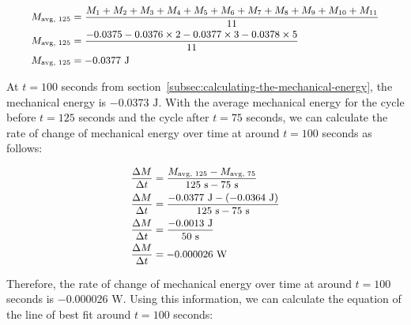 \documentclass[titlepage]{article}
\begin{document}
            \begin{equation}
                \small
                \begin{aligned}
                    M_{\text{avg, 125}} &= \frac{M_1 + M_2 + M_3 + M_4 + M_5 + M_6 + M_7 + M_8 + M_9 + M_{10} + M_{11}}{11} \\
                    M_{\text{avg, 125}} &= \frac{-0.0375 -0.0376 \times 2 -0.0377 \times 3 -0.0378 \times 5 }{11} \\
                    M_{\text{avg, 125}} &= -0.0377 \text{ J} \\
                \end{aligned}\label{eq:average-mechanical-energy-cycle-at-125-seconds}
            \end{equation}
            
            At $t=100$ seconds from section~\ref{subsec:calculating-the-mechanical-energy}, the mechanical energy is $-0.0373 \text{ J}$.
            With the average mechanical energy for the cycle before $t=125$ seconds and the cycle after $t=75$ seconds, we can calculate the rate of change of mechanical energy over time at around $t=100$ seconds as follows:
            
            \begin{equation}
                \small
                \begin{aligned}
                    \frac{\Delta M}{\Delta t} &= \frac{M_{\text{avg, 125}} - M_{\text{avg, 75}}} {125 \text{ s} - 75 \text{ s}} \\
                    \frac{\Delta M}{\Delta t} &= \frac{-0.0377 \text{ J} - (-0.0364 \text{ J})} {125 \text{ s} - 75 \text{ s}} \\
                    \frac{\Delta M}{\Delta t} &= \frac{-0.0013 \text{ J}} {50 \text{ s}} \\
                    \frac{\Delta M}{\Delta t} &= -0.000026 \text{ W} \\
                \end{aligned}\label{eq:rate-of-change-of-mechanical-energy-over-time-around-100-seconds}
            \end{equation}
            
            
            Therefore, the rate of change of mechanical energy over time at around $t=100$ seconds is $-0.000026 \text{ W}$.
            Using this information, we can calculate the equation of the line of best fit around $t=100$ seconds:
            
\end{document}
